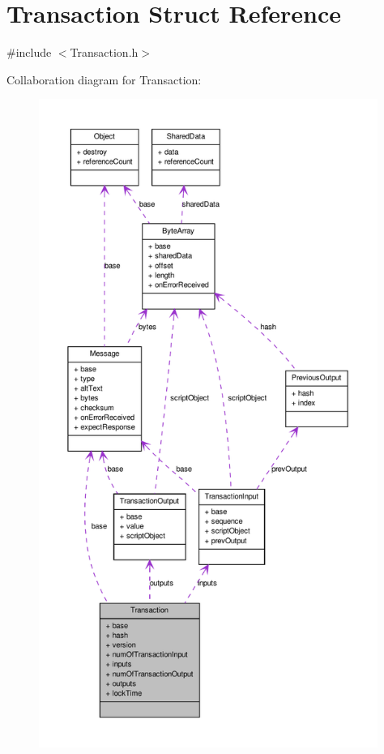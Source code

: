 \hypertarget{struct_transaction}{
\section{Transaction Struct Reference}
\label{struct_transaction}
}


{\ttfamily \#include $<$Transaction.h$>$}



Collaboration diagram for Transaction:\nopagebreak
\begin{figure}[H]
\begin{center}
\leavevmode
\includegraphics[height=600pt]{struct_transaction__coll__graph}
\end{center}
\end{figure}
